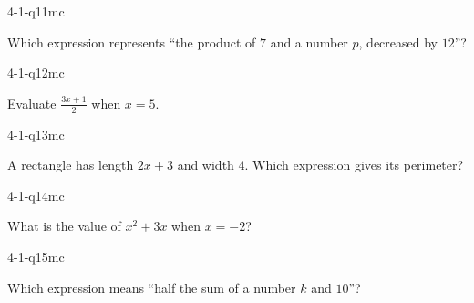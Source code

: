 \begin{practiceQuestion}{4-1-q11}{mc}
\begin{questionText}
Which expression represents ``the product of $7$ and a number $p$, decreased by $12$''?
\end{questionText}
\end{practiceQuestion}

\begin{practiceQuestion}{4-1-q12}{mc}
\begin{questionText}
Evaluate $\frac{3x + 1}{2}$ when $x = 5$.
\end{questionText}
\end{practiceQuestion}

\begin{practiceQuestion}{4-1-q13}{mc}
\begin{questionText}
A rectangle has length $2x + 3$ and width $4$. Which expression gives its perimeter?
\end{questionText}
\end{practiceQuestion}

\begin{practiceQuestion}{4-1-q14}{mc}
\begin{questionText}
What is the value of $x^2 + 3x$ when $x = -2$?
\end{questionText}
\end{practiceQuestion}

\begin{practiceQuestion}{4-1-q15}{mc}
\begin{questionText}
Which expression means ``half the sum of a number $k$ and $10$''?
\end{questionText}
\end{practiceQuestion}

